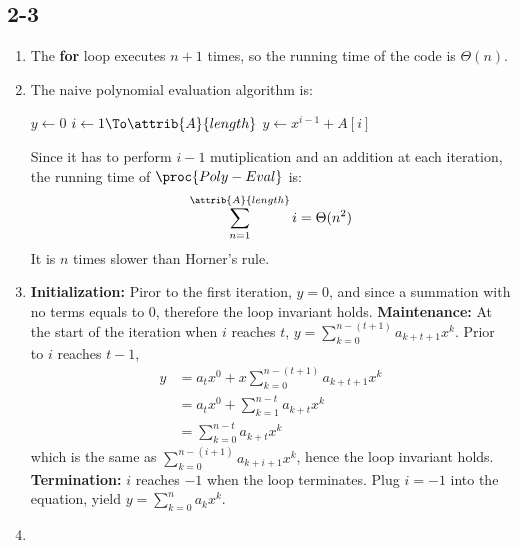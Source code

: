 \subsection{2-3}
\begin{enumerate}[leftmargin=*]
	\item The \textbf{for} loop executes $n+1$ times,
		so the running time of the code is $\Theta(n)$.
	\item The naive polynomial evaluation algorithm is:\\
		\vspace{-1.5em}
		\begin{codebox}
		\li	$y\gets 0$
		\li	\For $i\gets 1 \To \attrib{A}{length}$
			\Do
		\li		$y\gets x^{i-1}+A[i]$
			\End
		\end{codebox}
		Since it has to perform $i-1$ mutiplication and
		an addition at each iteration, the running time of 
		$\proc{Poly-Eval}$ is:
		\begin{displaymath}
			\sum_{n=1}^{\attrib{A}{length}} i=\Theta(n^2)
		\end{displaymath}
		It is $n$ times slower than Horner's rule.
	\item \textbf{Initialization:} Piror to the first 
		iteration, $y=0$, and since a summation with
		no terms equals to $0$, therefore the loop 
		invariant holds.
		\textbf{Maintenance:} At the start of 
		the iteration when $i$ reaches $t$, 
		$y=\sum_{k=0}^{n-(t+1)}a_{k+t+1}x^k$.
		Prior to $i$ reaches $t-1$, 
		\begin{align*}
			y&= a_tx^0+x\sum_{k=0}^{n-(t+1)}a_{k+t+1}x^k\\
			 &= a_tx^0+\sum_{k=1}^{n-t}a_{k+t}x^k\\
			 &= \sum_{k=0}^{n-t}a_{k+t}x^k
		\end{align*}
		which is the same as
		$\sum_{k=0}^{n-(i+1)}a_{k+i+1}x^k$, 
		hence the loop invariant holds.\\
		\textbf{Termination:} $i$ reaches $-1$ when the loop terminates. 
		Plug $i=-1$ into the equation, yield
		$y=\sum_{k=0}^{n}a_kx^k$.
	\item 
\end{enumerate}
